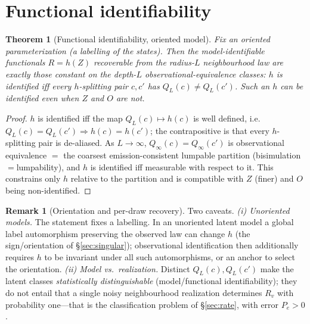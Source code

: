 \documentclass[11pt]{article}
\theoremstyle{plain}
\newtheorem{theorem}{Theorem}\newtheorem{proposition}{Proposition}\newtheorem{corollary}{Corollary}
\theoremstyle{definition}\newtheorem{assumption}{Assumption}\newtheorem{remark}{Remark}
\begin{document}
\section{Functional identifiability}\label{sec:func}
\begin{theorem}[Functional identifiability, oriented model]\label{thm:func}
Fix an oriented parameterization (a labelling of the states). Then the \emph{model-identifiable} functionals
$R=h(Z)$ recoverable from the radius-$L$ neighbourhood law are exactly those constant on the depth-$L$
observational-equivalence classes: $h$ is identified iff every $h$-splitting pair $c,c'$ has $Q_L(c)\neq Q_L(c')$.
Such an $h$ can be identified even when $Z$ and $O$ are not.
\end{theorem}
\begin{proof}
$h$ is identified iff the map $Q_L(c)\mapsto h(c)$ is well defined, i.e.\ $Q_L(c)=Q_L(c')\Rightarrow h(c)=h(c')$;
the contrapositive is that every $h$-splitting pair is de-aliased. As $L\to\infty$, $Q_\infty(c)=Q_\infty(c')$ is
observational equivalence $=$ the coarsest emission-consistent lumpable partition (bisimulation$=$lumpability), and
$h$ is identified iff measurable with respect to it. This constrains only $h$ relative to the partition and is
compatible with $Z$ (finer) and $O$ being non-identified.
\end{proof}
\begin{remark}[Orientation and per-draw recovery]
Two caveats. \emph{(i) Unoriented models.} The statement fixes a labelling. In an unoriented latent model a global
label automorphism preserving the observed law can change $h$ (the sign/orientation of \S\ref{sec:singular});
observational identification then additionally requires $h$ to be invariant under all such automorphisms, or an
anchor to select the orientation. \emph{(ii) Model vs.\ realization.} Distinct $Q_L(c),Q_L(c')$ make the latent
classes \emph{statistically distinguishable} (model/functional identifiability); they do not entail that a single
noisy neighbourhood realization determines $R_v$ with probability one---that is the classification problem of
\S\ref{sec:rate}, with error $P_e>0$.
\end{remark}
\end{document}
